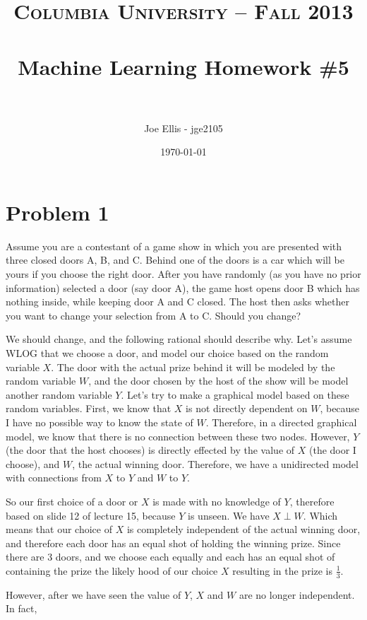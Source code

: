 \documentclass[paper=a4, fontsize=11pt]{scrartcl} %
\title{	
\normalfont \normalsize 
\textsc{Columbia University -- Fall 2013} \\ [25pt] %
\horrule{0.5pt} \\[0.4cm] %
\huge Machine Learning Homework \#5\\ %
\horrule{2pt} \\[0.5cm] %
}
\author{Joe Ellis - jge2105} %
\date{\normalsize\today} %
\begin{document}
\maketitle %


\section{Problem 1}
Assume you are a contestant of a game show in which you are presented with three closed doors A, B, and C. 
Behind one of the doors is a car which will be yours if you choose the right door. 
After you have randomly (as you have no prior information) selected a door (say door A), the game host opens door B which has nothing inside, while keeping door A and C closed. 
The host then asks whether you want to change your selection from A to C. 
Should you change?

We should change, and the following rational should describe why.
Let's assume WLOG that we choose a door, and model our choice based on the random variable $X$.  
The door with the actual prize behind it will be modeled by the random variable $W$, and the door chosen by the host of the show will be model another random variable $Y$.
Let's try to make a graphical model based on these random variables.  
First, we know that $X$ is not directly dependent on $W$, because I have no possible way to know the state of $W$.
Therefore, in a directed graphical model, we know that there is no connection between these two nodes.
However, $Y$ (the door that the host chooses) is directly effected by the value of $X$ (the door I choose), and $W$, the actual winning door. 
Therefore, we have a unidirected model with connections from $X$ to $Y$ and $W$ to $Y$.

So our first choice of a door or $X$ is made with no knowledge of $Y$, therefore based on slide 12 of lecture 15, because $Y$ is unseen. 
We have $X \perp W$.
Which means that our choice of $X$ is completely independent of the actual winning door, and therefore each door has an equal shot of holding the winning prize.  
Since there are 3 doors, and we choose each equally and each has an equal shot of containing the prize the likely hood of our choice $X$ resulting in the prize is $\frac{1}{3}$.

However, after we have seen the value of $Y$, $X$ and $W$ are no longer independent.
In fact, 
\end{document}
